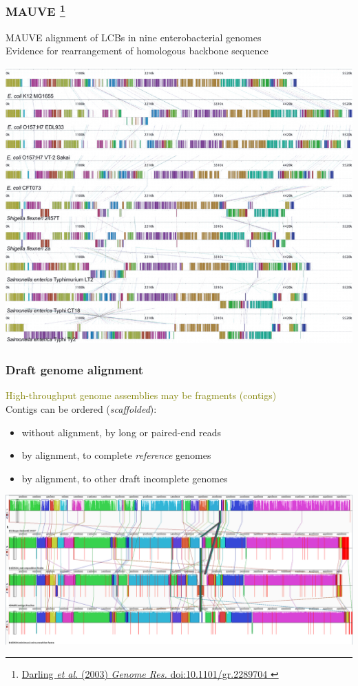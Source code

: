 %
\begin{frame}
  \frametitle{MAUVE
  \footnote{\tiny{\href{http://dx.doi.org/10.1101/gr.2289704
}{Darling \textit{et al.} (2003) \textit{Genome Res.} doi:10.1101/gr.2289704
}}}
  }
  MAUVE alignment of LCBs in nine enterobacterial genomes \\
  \textcolor{hutton_green}{Evidence for rearrangement of homologous backbone sequence}
  \begin{center}
    \includegraphics[height=0.6\textheight]{images/mauve_entero}
  \end{center}    
\end{frame}

%
\begin{frame}
  \frametitle{Draft genome alignment}
  \textcolor{olive}{High-throughput genome assemblies may be fragments (contigs)} \\
  Contigs can be ordered (\textit{scaffolded}):
  \begin{itemize}
    \item \textcolor{hutton_blue}{without alignment}, by long or paired-end reads
    \item \textcolor{hutton_purple}{by alignment}, to complete \textit{reference} genomes
    \item \textcolor{hutton_purple}{by alignment}, to other draft incomplete genomes
  \end{itemize}
  \begin{center}
    \includegraphics[width=\textwidth]{images/mauve_scaffolding}
  \end{center}    
\end{frame}

